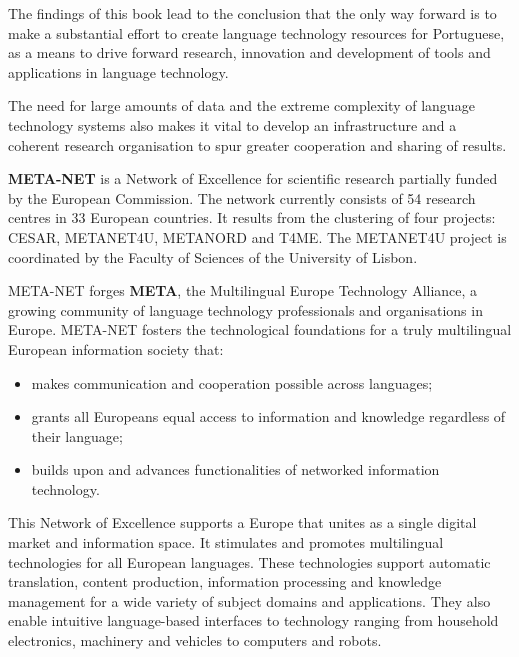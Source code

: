\begin{multicols}{2}
The findings of this book lead to the conclusion that the only way forward is to make a substantial effort to create language technology resources for Portuguese, as a means to drive forward research, innovation and development of tools and applications in language technology. 

The need for large amounts of data and the extreme complexity of language technology systems also makes it vital to develop an infrastructure and a coherent research organisation to spur greater cooperation and sharing of results.


\end{multicols}

\clearpage


\begin{multicols}{2}

\textbf{META-NET} is a Network of Excellence for scientific research partially funded by the European Commission. 
The network currently consists of 54 research centres in 33 European countries. 
It results from the clustering of four projects: CESAR, METANET4U, METANORD and T4ME.
The METANET4U project is coordinated by the Faculty of Sciences of the University of Lisbon.

META-NET forges \textbf{META}, 
the Multilingual Europe Technology Alliance, a growing community of language technology professionals and organisations 
in Europe. META-NET fosters the technological foundations for a truly multilingual European information society that:

\begin{itemize}
\item makes communication and cooperation possible across languages;
\item grants all Europeans equal access to information and knowledge regardless of their language;
\item builds upon and advances functionalities of networked information technology.
\end{itemize}

This Network of Excellence supports a Europe that unites as a single digital market and information space. It stimulates and promotes multilingual technologies for all European languages. These technologies support automatic translation, content production, information processing and know\-ledge management for a wide variety of subject domains and applications. They also enable intui\-tive language-based interfaces to technology ranging from household electronics, machinery and vehicles to computers and robots.


\end{multicols}
